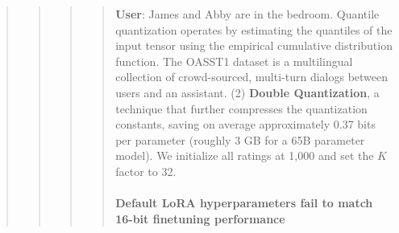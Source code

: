 \begin{quote}
\begin{quote}
{\begin{quote}
\begin{quote}
    \textbf{User}: James and Abby are in the bedroom. Quantile quantization operates by estimating the quantiles of the input tensor using the empirical cumulative distribution function. The OASST1 dataset is a multilingual collection of crowd-sourced, multi-turn dialogs between users and an assistant. (2) \textbf{Double Quantization}, a technique that further compresses the quantization constants, saving on average approximately 0.37 bits per parameter (roughly 3 GB for a 65B parameter model). We initialize all ratings at 1,000 and set the $K$ factor to 32. \paragraph{Default LoRA hyperparameters fail to match 16-bit finetuning performance} 


\end{quote}
\end{quote}}
\end{quote}
\end{quote}
